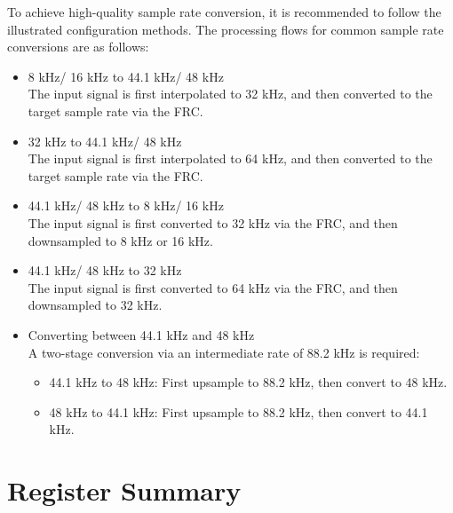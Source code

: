 \documentclass[main\_\_EN.tex]{subfiles}
\begin{document}
To achieve high-quality sample rate conversion, it is recommended to follow the illustrated configuration methods. The processing flows for common sample rate conversions are as follows:

\begin{itemize}
  \item 8 kHz/ 16 kHz to 44.1 kHz/ 48 kHz \\
  The input signal is first interpolated to 32 kHz, and then converted to the target sample rate via the FRC.

  \item 32 kHz to 44.1 kHz/ 48 kHz \\
  The input signal is first interpolated to 64 kHz, and then converted to the target sample rate via the FRC.

  \item 44.1 kHz/ 48 kHz to 8 kHz/ 16 kHz \\
  The input signal is first converted to 32 kHz via the FRC, and then downsampled to 8 kHz or 16 kHz.

  \item 44.1 kHz/ 48 kHz to 32 kHz \\
  The input signal is first converted to 64 kHz via the FRC, and then downsampled to 32 kHz.

  \item Converting between 44.1 kHz and 48 kHz \\
  A two-stage conversion via an intermediate rate of 88.2 kHz is required:
  \begin{itemize}
    \item 44.1 kHz to 48 kHz: First upsample to 88.2 kHz, then convert to 48 kHz.
    \item 48 kHz to 44.1 kHz: First upsample to 88.2 kHz, then convert to 44.1 kHz.
  \end{itemize}

\end{itemize}



\newpage
\hypertarget{asrc-reg-summ}{}
\section{Register Summary}
\label{sec:asrc-reg-summ}
\end{document}
